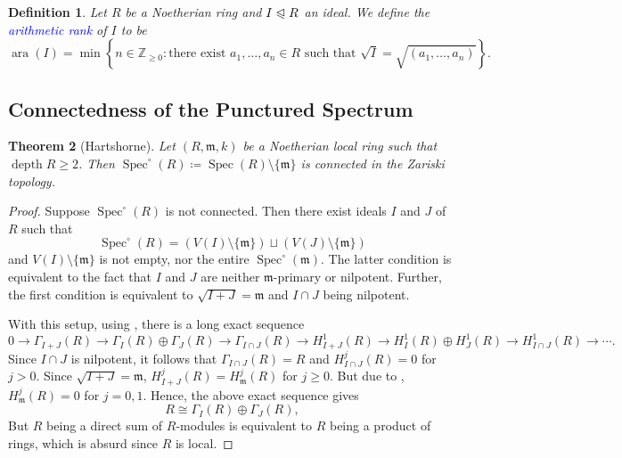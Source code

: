 \documentclass[10pt]{article}
\theoremstyle{thmstyle}
\newtheorem{theorem}{Theorem}[section]
\theoremstyle{defstyle}
\newtheorem{definition}[theorem]{Definition}
\newcommand{\Z}{\mathbb{Z}}
\newcommand{\Spec}{\operatorname{Spec}}
\newcommand{\frakm}{\mathfrak{m}} %
\newcommand{\define}[1]{\textcolor{blue}{\textit{#1}}}
\renewcommand{\ge}{\geqslant}
\newcommand{\noreq}{\trianglelefteqslant}
\newcommand{\depth}{\operatorname{depth}}
\newcommand{\ara}{\operatorname{ara}}
\begin{document}
\begin{definition}
	Let $R$ be a Noetherian ring and $I\noreq R$ an ideal. We define the \define{arithmetic rank} of $I$ to be 
	\begin{equation*}
		\ara(I) = \min\left\{n\in\Z_{\ge 0}\colon\text{there exist }a_1,\dots,a_n\in R\text{ such that }\sqrt I = \sqrt{(a_1,\dots,a_n)}\right\}.
	\end{equation*}
\end{definition}

\subsection{Connectedness of the Punctured Spectrum}

\begin{theorem}[Hartshorne]
	Let $(R,\frakm, k)$ be a Noetherian local ring such that $\depth R\ge 2$. Then $\Spec^\circ (R) \coloneq\Spec(R)\setminus\{\frakm\}$ is connected in the Zariski topology.
\end{theorem}
\begin{proof}
	Suppose $\Spec^\circ (R)$ is not connected. Then there exist ideals $I$ and $J$ of $R$ such that
	\begin{equation*}
		\Spec^\circ(R) = \left(V(I)\setminus\{\frakm\}\right)\sqcup\left(V(J)\setminus\{\frakm\}\right)
	\end{equation*}
	and $V(I)\setminus\{\frakm\}$ is not empty, nor the entire $\Spec^\circ(\frakm)$. The latter condition is equivalent to the fact that $I$ and $J$ are neither $\frakm$-primary or nilpotent. Further, the first condition is equivalent to $\sqrt{I + J} = \frakm$ and $I\cap J$ being nilpotent.

	With this setup, using , there is a long exact sequence 
	\begin{equation*}
		0\to\Gamma_{I + J}(R)\to\Gamma_I(R)\oplus\Gamma_J(R)\to\Gamma_{I\cap J}(R)\to H^1_{I + J}(R)\to H^1_I(R)\oplus H^1_J(R)\to H^1_{I\cap J}(R)\to\cdots.
	\end{equation*}
	Since $I\cap J$ is nilpotent, it follows that $\Gamma_{I\cap J}(R) = R$ and $H^j_{I\cap J}(R) = 0$ for $j > 0$. Since $\sqrt{I + J} = \frakm$, $H^j_{I + J}(R) = H^j_\frakm(R)$ for $j\ge 0$. But due to , $H^j_\frakm(R) = 0$ for $j = 0, 1$. Hence, the above exact sequence gives 
	\begin{equation*}
		R\cong \Gamma_I(R)\oplus\Gamma_J(R),
	\end{equation*}
	But $R$ being a direct sum of $R$-modules is equivalent to $R$ being a product of rings, which is absurd since $R$ is local.
\end{proof}
\end{document}
